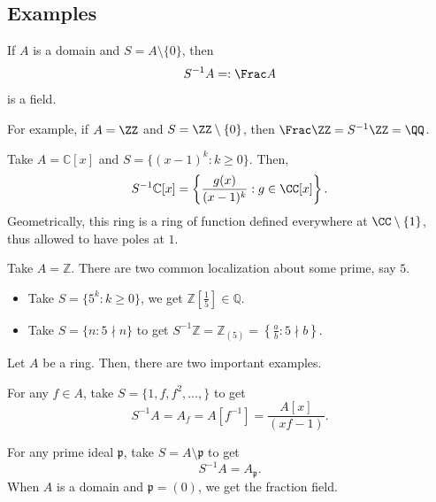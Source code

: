 \subsection{Examples}
\begin{example}
    If $A$ is a domain and $S=A\setminus\{0\}$, then
    $$S^{-1}A  =: \Frac A$$
    is a field.

    For example, if $A=\ZZ$ and $S=\ZZ\setminus\{0\}$,
    then $\Frac \ZZ = S^{-1}\ZZ = \QQ$.
\end{example}
\begin{example}
    Take $A=\mathbb C[x]$ and $S=\{(x-1)^k : k\geq 0\}$.
    Then,
    $$S^{-1}\mathbb C[x]
    = \left\{\frac{g(x)}{(x-1)^k} : g\in\CC[x]\right\}.$$
    Geometrically, this ring is a ring of function defined everywhere at $\CC\setminus\{1\}$,
    thus allowed to have poles at $1$.
\end{example}
\begin{example}
    Take $A=\mathbb Z$. There are two common localization
    about some prime, say $5$.
    \begin{itemize}
	\item Take $S=\{5^k : k\geq 0\}$, we get
	    $\mathbb Z\left[\frac 15\right]\in\mathbb Q$.
	\item Take $S=\{n : 5\nmid n\}$ to get
	    $S^{-1}\mathbb Z = \mathbb Z_{(5)}
	    = \left\{\frac ab : 5\nmid b\right\}$.
    \end{itemize}
\end{example}
\begin{example}
    Let $A$ be a ring. Then, there are two important examples.
    \begin{alphenum}
	\item {}
        For any $f\in A$, take
	    $S = \{1,f,f^2,\dots,\}$ to get
	    $$S^{-1}A = A_f = A[f^{-1}]
	    = \frac{A[x]}{(xf-1)}.$$
	\item {}
        For any prime ideal $\mathfrak p$, take
	    $S=A\setminus\mathfrak p$ to get
	    $$S^{-1}A = A_{\mathfrak p}.$$
	    When $A$ is a domain and $\mathfrak p=(0)$,
	    we get the fraction field.
    \end{alphenum}
\end{example}
%
%
%
%

